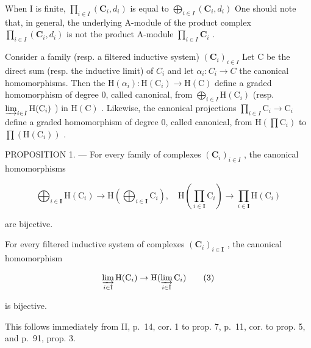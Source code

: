 When I is finite, \(\prod_{i\in I}(\mathbf{C}_{i},d_{i})\) is equal to \(\bigoplus_{i\in I}(\mathbf{C}_{i},d_{i})\) One should note that, in general, the underlying A-module of the product complex \(\prod_{i\in I}(\mathbf{C}_{i},d_{i})\) is not the product A-module \(\prod_{i\in I}\mathbf{C}_{i}\) .

Consider a family (resp. a filtered inductive system) \((\mathbf{C}_i)_{i\in I}\) Let C be the direct sum (resp. the inductive limit) of \(C_i\) and let \(\alpha_{i}:C_{i}\to C\) the canonical homomorphisms. Then the \(\mathrm{H}(\alpha_{i}): \mathrm{H}(\mathrm{C}_{i})\to \mathrm{H}(\mathrm{C})\) define a graded homomorphism of degree 0, called canonical, from \(\bigoplus_{i\in I}\mathrm{H}(\mathrm{C}_{i})\) (resp. \(\varinjlim_{i\in I}\mathrm{H}(\mathrm{C}_{i})\) ) in \(\mathrm{H}(\mathrm{C})\) . Likewise, the canonical projections \(\prod_{i\in I}\mathrm{C}_{i}\to \mathrm{C}_{i}\) define a graded homomorphism of degree 0, called canonical, from \(\mathrm{H}(\prod \mathrm{C}_i)\) to \(\prod (\mathrm{H}(\mathrm{C}_i))\) .

PROPOSITION 1. --- For every family of complexes \((\mathbf{C}_{i})_{i\in I}\) , the canonical homomorphisms

\[
\bigoplus_ {i \in \mathbf {I}} \mathrm{H} (\mathrm{C} _ {i}) \rightarrow \mathrm{H} \left(\bigoplus_ {i \in \mathbf {I}} \mathrm{C} _ {i}\right), \quad \mathrm{H} \left(\prod_ {i \in \mathbf {I}} \mathrm{C} _ {i}\right)\rightarrow \prod_ {i \in \mathbf {I}} \mathrm{H} (\mathrm{C} _ {i})\tag{2}
\]

are bijective.

For every filtered inductive system of complexes \((\mathbf{C}_{i})_{i\in\mathbf{I}}\) , the canonical homomorphism

\[
\varinjlim_ {i \in \mathrm{I}} \mathrm{H} (\mathrm{C} _ {i}) \to \mathrm{H} (\varinjlim_ {i \in \mathrm{I}} \mathrm{C} _ {i})\tag{3}
\]

is bijective.

This follows immediately from II, p.~14, cor. 1 to prop. 7, p.~11, cor. to prop. 5, and p.~91, prop. 3.

